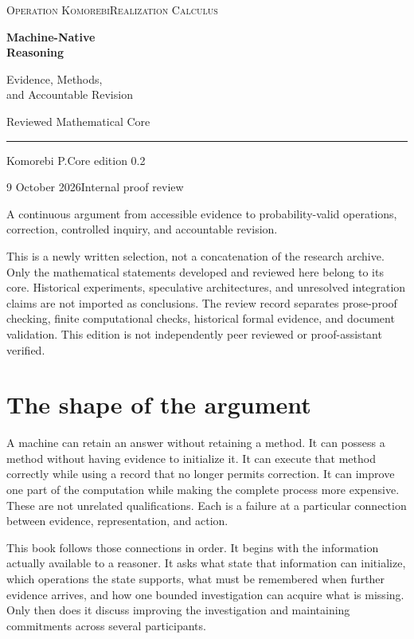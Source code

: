 \documentclass[11pt,oneside,openany]{book}
\theoremstyle{definition}\newtheorem{definition}[theorem]{Definition}
\begin{document}
\frontmatter
\begin{titlepage}
{\small\scshape Operation Komorebi\hfill Realization Calculus}\par
\vspace*{0.8in}
{\Huge\bfseries Machine-Native\\[0.12in]Reasoning\par}
\vspace{0.28in}
{\LARGE Evidence, Methods,\\and Accountable Revision\par}
\vspace{0.45in}
{\Large Reviewed Mathematical Core\par}
\vspace{0.25in}\hrule\vspace{0.2in}
Komorebi P.\hfill Core edition 0.2\par
9 October 2026\hfill Internal proof review\par
\vfill
{\large A continuous argument from accessible evidence to probability-valid operations, correction, controlled inquiry, and accountable revision.\par}
\vspace{0.3in}
This is a newly written selection, not a concatenation of the research archive. Only the mathematical statements developed and reviewed here belong to its core. Historical experiments, speculative architectures, and unresolved integration claims are not imported as conclusions.
\vspace{0.2in}
{\small The review record separates prose-proof checking, finite computational checks, historical formal evidence, and document validation. This edition is not independently peer reviewed or proof-assistant verified.}
\end{titlepage}
\chapter*{The shape of the argument}
A machine can retain an answer without retaining a method. It can possess a method without having evidence to initialize it. It can execute that method correctly while using a record that no longer permits correction. It can improve one part of the computation while making the complete process more expensive. These are not unrelated qualifications. Each is a failure at a particular connection between evidence, representation, and action.

This book follows those connections in order. It begins with the information actually available to a reasoner. It asks what state that information can initialize, which operations the state supports, what must be remembered when further evidence arrives, and how one bounded investigation can acquire what is missing. Only then does it discuss improving the investigation and maintaining commitments across several participants.
\end{document}
